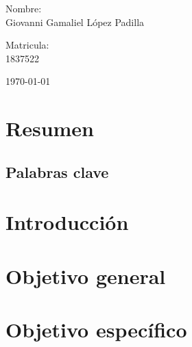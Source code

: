 \documentclass[12pt,letterpaper]{article}
\begin{document}
\begin{titlepage}
\begin{center}
\begin{minipage}{0.6\linewidth}
\vspace{0.5cm}
\changefontsizes{14pt}
Nombre:\\
Giovanni Gamaliel López Padilla\\
\end{minipage}
\begin{minipage}{0.2\linewidth}
\changefontsizes{14pt}
Matricula:\\
1837522
\end{minipage}
\end{center}
\vspace{4cm}
\begin{flushright}
\today
\end{flushright}
\end{titlepage}
\begin{multicols}{2}
\section*{Resumen}
\subsection*{Palabras clave}
\section*{Introducción}
\section*{Objetivo general}
\section*{Objetivo específico}

\end{multicols}
\end{document}
